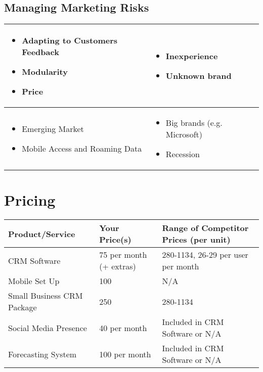 \documentclass[DIV=calc, paper=a4, fontsize=11pt]{scrartcl}	 %
\begin{document}
\subsection{Managing Marketing Risks}
\begin{tabular}{|p{}|p{}|} \hline
\begin{itemize}
\item Adapting to Customers Feedback
\item Modularity
\item Price
\end{itemize} & 
\begin{itemize}
\item Inexperience
\item Unknown brand
\end{itemize}\\ \hline
\begin{itemize}
\item Emerging Market
\item Mobile Access and Roaming Data
\end{itemize} &
\begin{itemize}
\item Big brands (e.g. Microsoft)
\item Recession
\end{itemize} \\ \hline
\end{tabular}

\section{Pricing}

\begin{tabular}{|l|l|l|} \hline
Product/Service    & Your Price(s) & Range of Competitor Prices (per unit) \\ \hline
CRM Software       & 75 per month (+ extras)  & 280-1134, 26-29 per user per month \\ \hline
Mobile Set Up      & 100           & N/A \\ \hline
Small Business CRM Package & 250   & 280-1134 \\ \hline
Social Media Presence & 40 per month & Included in CRM Software or N/A \\ \hline
Forecasting System & 100 per month & Included in CRM Software or N/A \\ \hline
\end{tabular}
\end{document}
